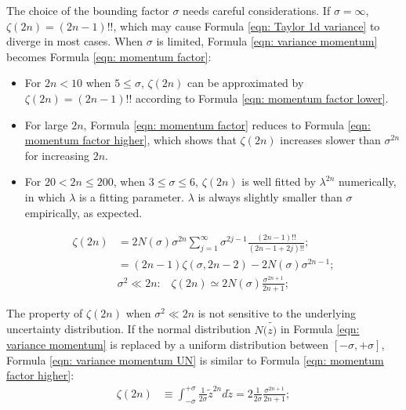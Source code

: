 \documentclass[twoside]{article}
\numberwithin{equation}{section}
\newcommand{\eqspace}{\;\;\;}
\begin{document}
The choice of the bounding factor $\sigma$ needs careful considerations.
If $\sigma = \infty$, $\zeta(2n) = (2n - 1)!!$, which may cause Formula \eqref{eqn: Taylor 1d variance} to diverge in most cases.
When $\sigma$ is limited, Formula \eqref{eqn: variance momentum} becomes Formula \eqref{eqn: momentum factor}:
\begin{itemize}
\item For $2n < 10$ when $5 \leq \sigma$, $\zeta(2n)$ can be approximated by $\zeta(2n) = (2n-1)!!$ according to Formula \eqref{eqn: momentum factor lower}.  

\item For large $2n$, Formula \eqref{eqn: momentum factor} reduces to Formula \eqref{eqn: momentum factor higher}, which shows that $\zeta(2n)$ increases slower than $\sigma^{2n}$ for increasing $2n$.

\item For $20 < 2n \leq 200$, when $3 \leq \sigma \leq 6$, $\zeta(2n)$ is well fitted by $\lambda^{2n}$ numerically, in which $\lambda$ is a fitting parameter. 
$\lambda$ is always slightly smaller than $\sigma$ empirically, as expected.
\end{itemize}
\begin{align}
\label{eqn: momentum factor} 
\zeta(2n) &= 2 N(\sigma) \sigma^{2n} \sum_{j=1}^{\infty} \sigma^{2j-1} \frac{(2n - 1)!!}{(2n-1 + 2j)!!}; \\
\label{eqn: momentum factor lower} 
 &= (2n - 1) \zeta(\sigma, 2n - 2) - 2 N(\sigma) \sigma^{2n - 1}; \\
\label{eqn: momentum factor higher} 
&\sigma^2 \ll 2n:\eqspace \zeta(2n) \simeq 2 N(\sigma) \frac{\sigma^{2n+1}}{2n+1};
\end{align}

The property of $\zeta(2n)$ when $\sigma^2 \ll 2n$ is not sensitive to the underlying uncertainty distribution.  If the normal distribution $N(\tilde{z)}$ in Formula \eqref{eqn: variance momentum} is replaced by a uniform distribution between $[-\sigma, +\sigma]$,  Formula \eqref{eqn: variance momentum UN} is similar to Formula \eqref{eqn: momentum factor higher}:
\begin{align}
\label{eqn: variance momentum UN}
\zeta(2n) &\equiv \int_{-\sigma}^{+\sigma} \frac{1}{2 \sigma} \tilde{z}^{2n} d \tilde{z} = 2 \frac{1}{2 \sigma} \frac{{\sigma}^{2n+1}}{2n + 1}; 
\end{align}
\end{document}
